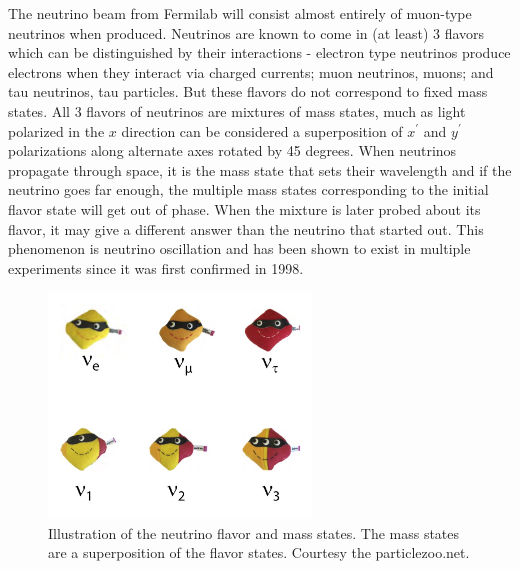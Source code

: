 The neutrino beam from Fermilab will consist almost entirely of muon-type neutrinos when produced.  Neutrinos are known to come in (at least) 3 flavors which can be distinguished by their interactions - electron type neutrinos produce electrons when they interact via charged currents; muon neutrinos, muons; and tau neutrinos, tau particles.  But these flavors do not correspond to fixed mass states.  All 3 flavors of neutrinos are mixtures of mass states, much as  light polarized in the $x$ direction  can be considered a superposition of  $x^\prime$ and $y^\prime$ polarizations along  alternate axes rotated by 45 degrees.  When neutrinos propagate through space, it is the mass state that sets their wavelength and if the neutrino goes far enough, the multiple mass states  corresponding to the initial flavor state will get out of phase.  When the mixture is later probed about its flavor, it  may give a different answer than the neutrino that started out. This phenomenon is neutrino oscillation and has been shown to exist in multiple experiments since it was first confirmed in 1998\cite{Kajita2006}.

\begin{figure}[h]
    \centering
\includegraphics[height=6cm]{graphics/IntroFigures/Fig_01_neutrinos.jpg}
    \caption{Illustration of the neutrino flavor and mass states.  The mass states are a superposition of the flavor states.  Courtesy the particlezoo.net.}
    \label{fig:neutrinos}
\end{figure}

